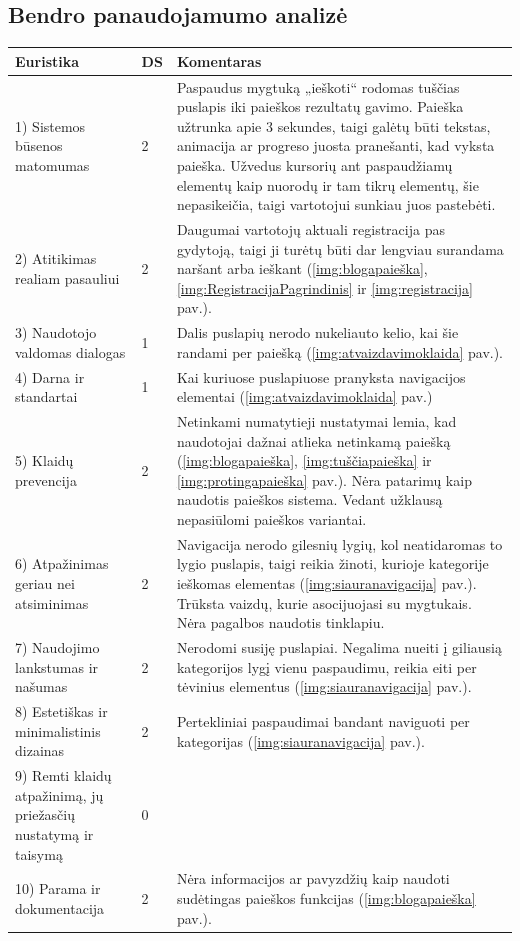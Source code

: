 \documentclass{VUMIFPSkursinis}
\begin{document}
\subsection{Bendro panaudojamumo analizė}

\begin{center}
\begin{tabular}{ | p{4cm} | p{} | p{11cm} | } 
 \hline
	Euristika & DS & Komentaras \\ \hline
	1) Sistemos būsenos matomumas & 2 & Paspaudus mygtuką „ieškoti“ rodomas tuščias puslapis iki paieškos rezultatų gavimo. Paieška užtrunka apie 3 sekundes, taigi galėtų būti tekstas, animacija ar progreso juosta pranešanti, kad vyksta paieška. Užvedus kursorių ant paspaudžiamų elementų kaip nuorodų ir tam tikrų elementų, šie nepasikeičia, taigi vartotojui sunkiau juos pastebėti. \\ \hline
	2) Atitikimas realiam pasauliui  & 2 & Daugumai vartotojų aktuali registracija pas gydytoją, taigi ji turėtų būti dar lengviau surandama naršant arba ieškant (\ref{img:blogapaieška}, \ref{img:RegistracijaPagrindinis} ir \ref{img:registracija} pav.). \\ \hline
	3) Naudotojo valdomas dialogas & 1 & Dalis puslapių nerodo nukeliauto kelio, kai šie randami per paiešką (\ref{img:atvaizdavimoklaida} pav.). \\ \hline
	4) Darna ir standartai & 1 & Kai kuriuose puslapiuose pranyksta navigacijos elementai (\ref{img:atvaizdavimoklaida} pav.) \\ \hline
	5) Klaidų prevencija & 2 & Netinkami numatytieji nustatymai lemia, kad naudotojai dažnai atlieka netinkamą paiešką (\ref{img:blogapaieška}, \ref{img:tuščiapaieška} ir \ref{img:protingapaieška} pav.). Nėra patarimų kaip naudotis paieškos sistema. Vedant užklausą nepasiūlomi paieškos variantai. \\ \hline
	6) Atpažinimas geriau nei atsiminimas & 2 & Navigacija nerodo gilesnių lygių, kol neatidaromas to lygio puslapis, taigi reikia žinoti, kurioje kategorije ieškomas elementas (\ref{img:siauranavigacija} pav.). Trūksta vaizdų, kurie asocijuojasi su mygtukais. Nėra pagalbos naudotis tinklapiu. \\ \hline
	7) Naudojimo lankstumas ir našumas & 2 & Nerodomi susiję puslapiai. Negalima nueiti į giliausią kategorijos lygį vienu paspaudimu, reikia eiti per tėvinius elementus (\ref{img:siauranavigacija} pav.). \\ \hline
	8) Estetiškas ir minimalistinis dizainas & 2 & Pertekliniai paspaudimai bandant naviguoti per kategorijas (\ref{img:siauranavigacija} pav.). \\ \hline
	9) Remti klaidų atpažinimą, jų priežasčių nustatymą ir taisymą & 0 &  \\ \hline
	10) Parama ir dokumentacija & 2 & Nėra informacijos ar pavyzdžių kaip naudoti sudėtingas paieškos funkcijas (\ref{img:blogapaieška} pav.). \\ \hline
\end{tabular}
\label{EuristikųLentelėPrad}
\end{center}
\end{document}
